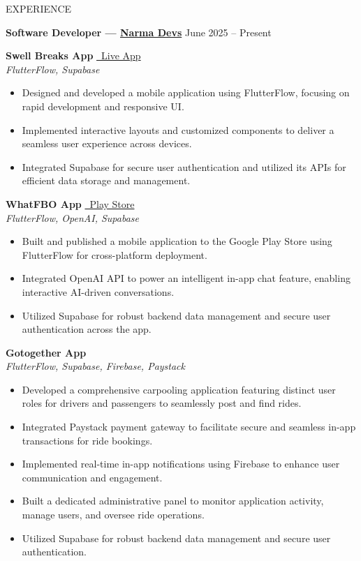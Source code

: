 \documentclass{shivam_resume} %
\begin{document}
\begin{rSection}{EXPERIENCE}

\textbf{Software Developer — \href{https://narma.dev/}{Narma Devs}} \hfill {June 2025 -- Present}
\vspace{0.5em}

\textbf{Swell Breaks App} \hfill \href{https://swell-breaks.flutterflow.app/}{\faLink\ Live App} \\
\textit{FlutterFlow, Supabase}
\begin{itemize}
\itemsep -3pt
\small
\item Designed and developed a mobile application using FlutterFlow, focusing on rapid development and responsive UI.
\item Implemented interactive layouts and customized components to deliver a seamless user experience across devices.
\item Integrated Supabase for secure user authentication and utilized its APIs for efficient data storage and management.
\end{itemize}

\textbf{WhatFBO App} \hfill \href{https://play.google.com/store/apps/details?id=uk.co.creatanet.whatfbo}{\faGooglePlay\ Play Store} \\
\textit{FlutterFlow, OpenAI, Supabase}
\begin{itemize}
\itemsep -3pt
\small
\item Built and published a mobile application to the Google Play Store using FlutterFlow for cross-platform deployment.
\item Integrated OpenAI API to power an intelligent in-app chat feature, enabling interactive AI-driven conversations.
\item Utilized Supabase for robust backend data management and secure user authentication across the app.
\end{itemize}

\textbf{Gotogether App} \\
\textit{FlutterFlow, Supabase, Firebase, Paystack}
\begin{itemize}
\itemsep -3pt
\small
\item Developed a comprehensive carpooling application featuring distinct user roles for drivers and passengers to seamlessly post and find rides.
\item Integrated Paystack payment gateway to facilitate secure and seamless in-app transactions for ride bookings.
\item Implemented real-time in-app notifications using Firebase to enhance user communication and engagement.
\item Built a dedicated administrative panel to monitor application activity, manage users, and oversee ride operations.
\item Utilized Supabase for robust backend data management and secure user authentication.
\end{itemize}

\end{rSection}
\end{document}
